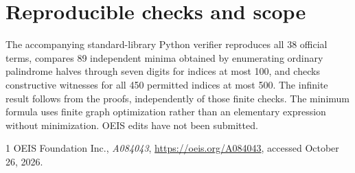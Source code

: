 \documentclass[10pt]{article}
\begin{document}
\section{Reproducible checks and scope}
The accompanying standard-library Python verifier reproduces all 38 official terms, compares 89 independent minima obtained by enumerating ordinary palindrome halves through seven digits for indices at most 100, and checks constructive witnesses for all 450 permitted indices at most 500. The infinite result follows from the proofs, independently of those finite checks. The minimum formula uses finite graph optimization rather than an elementary expression without minimization. OEIS edits have not been submitted.
\begin{thebibliography}{1}
 OEIS Foundation Inc., \emph{A084043}, \url{https://oeis.org/A084043}, accessed October 26, 2026.
\end{thebibliography}
\end{document}
